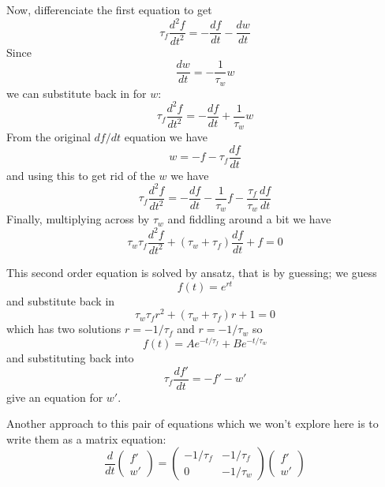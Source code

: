 \documentclass{article}
\begin{document}
Now, differenciate the first equation to get
\begin{equation}
\tau_f \frac{d^2f}{dt^2}=-\frac{df}{dt}-\frac{dw}{dt}
\end{equation}
Since 
\begin{equation}
\frac{dw}{dt}=-\frac{1}{\tau_w}w
\end{equation}
we can substitute back in for $w$:
\begin{equation}
\tau_f \frac{d^2f}{dt^2}=-\frac{df}{dt}+\frac{1}{\tau_w}w
\end{equation}
From the original $df/dt$ equation we have
\begin{equation}
w=-f-\tau_f \frac{df}{dt}
\end{equation}
and using this to get rid of the $w$ we have
\begin{equation}
\tau_f \frac{d^2f}{dt^2}=-\frac{df}{dt}-\frac{1}{\tau_w}f-\frac{\tau_f}{\tau_w}\frac{df}{dt}
\end{equation}
Finally, multiplying across by $\tau_w$ and fiddling around a bit we have
\begin{equation}
\tau_w\tau_f \frac{d^2f}{dt^2}+(\tau_w+\tau_f)\frac{df}{dt}+f=0
\end{equation}

This second order equation is solved by ansatz, that is by guessing; we guess
\begin{equation}
f(t)=e^{rt}
\end{equation}
and substitute back in
\begin{equation}
\tau_w\tau_f r^2+(\tau_w+\tau_f)r+1=0
\end{equation}
which has two solutions $r=-1/\tau_f$ and $r=-1/\tau_w$ so
\begin{equation}
f(t)=Ae^{-t/\tau_f}+Be^{-t/\tau_w}
\end{equation}
and substituting back into 
\begin{equation}
\tau_f \frac{df'}{dt}=-f'-w'
\end{equation}
give an equation for $w'$.

Another approach to this pair of equations which we won't explore here
is to write them as a matrix equation:
\begin{equation}
\frac{d}{dt}\left(\begin{array}{c}f'\\w'\end{array}\right)
=\left(\begin{array}{cc}-1/\tau_f&-1/\tau_f\\0&-1/\tau_w\end{array}\right)
\left(\begin{array}{c}f'\\w'\end{array}\right)
\end{equation}
\end{document}
